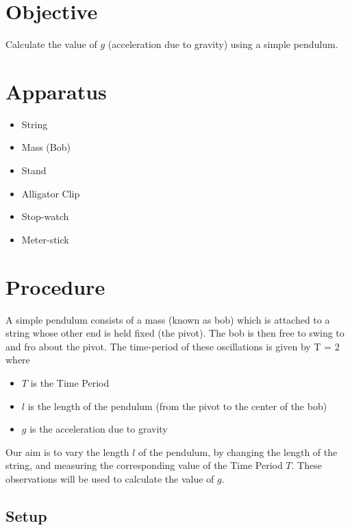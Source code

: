 \section{Objective}

    Calculate the value of $g$ (acceleration due to gravity) using a simple pendulum.

\section{Apparatus}

    \begin{itemize}

        \item String
        \item Mass (Bob)
        \item Stand
        \item Alligator Clip
        \item Stop-watch
        \item Meter-stick

    \end{itemize}

\section{Procedure}

    A simple pendulum consists of a mass (known as bob) which is attached to a string whose other end is held fixed (the pivot). The bob is then free to swing to and fro about the pivot. The time-period of these oscillations is given by
    \beq \label{main}
        T = 2 \pi {}
    \eeq
    where
    \begin{itemize}
        \item $T$ is the Time Period
        \item $l$ is the length of the pendulum (from the pivot to the center of the bob)
        \item $g$ is the acceleration due to gravity
    \end{itemize}

    Our aim is to vary the length $l$ of the pendulum, by changing the length of the string, and measuring the corresponding value of the Time Period $T$. These observations will be used to calculate the value of $g$.

\subsection{Setup}

